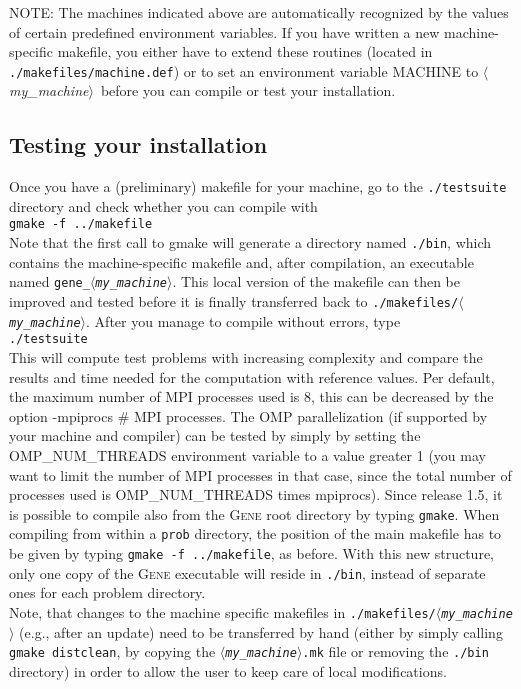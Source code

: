 \documentclass[12pt]{article}
\newcommand{\mach}{$\langle$\textsl{my\_machine}$\rangle$}
\begin{document}
NOTE: The machines indicated above are automatically recognized by the values of certain predefined
environment variables. If you have written a new machine-specific makefile, you either have to
extend these routines (located in {\tt ./makefiles/machine.def})
or to set an environment variable MACHINE to \mach\ before you can compile or test your installation.

\subsection{Testing your installation}
Once you have a (preliminary) makefile for your machine, go to the \texttt{./testsuite} directory
and check whether you can compile with\\
\qquad\verb|gmake -f ../makefile| \\
Note that the first call to gmake will generate a directory named \texttt{./bin}, which contains
the machine-specific makefile and, after compilation, an executable named \texttt{gene\_\mach}.
This local version of the makefile can then be improved and tested before it is finally transferred back to
\texttt{./makefiles/\mach}.
After you manage to compile without errors, type \\
\qquad\verb|./testsuite| \\
This will compute test problems with increasing complexity and
compare the results and time needed for the computation with reference values.
Per default, the maximum number of MPI processes used is 8, this can be decreased by the option
-mpiprocs \# MPI processes. The OMP parallelization (if supported by your machine and compiler) can
be tested by simply by setting the OMP\_NUM\_THREADS environment variable to a value greater 1 (you
may want to limit the number of MPI processes in that case, since the total number of processes used is
OMP\_NUM\_THREADS times mpiprocs).
Since release 1.5, it is possible to compile also from the \textsc{Gene} root directory
by typing \verb|gmake|. When compiling from within a \texttt{prob} directory, the position of the main
makefile has to be given by typing \verb|gmake -f ../makefile|, as before. With this new structure,
only one copy of the \textsc{Gene} executable will reside in \texttt{./bin}, instead of
separate ones for each problem directory. \\
Note, that changes to the machine specific makefiles in \texttt{./makefiles/\mach}
(e.g., after an update) need to be transferred by hand (either by simply calling \texttt{gmake distclean},
by copying the \texttt{\mach .mk} file or removing the \texttt{./bin} directory) in order to allow
the user to keep care of local modifications.
\end{document}

